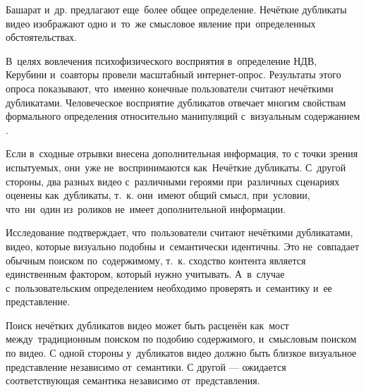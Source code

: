 \documentclass{.local/lib/classes/ndvr-super-article-standalone}
\begin{document}
    Башарат и~др. \cite{Basharat:2008}  
    предлагают еще~более общее определение.
    Нечёткие дубликаты видео изображают 
    одно и~то~же смысловое явление
    при~определенных обстоятельствах.

    В~целях вовлечения психофизического восприятия в~определение НДВ,
    Керубини и~соавторы \cite{Cherubini:2009} 
    провели масштабный интернет-опрос.
    Результаты этого опроса показывают, что~именно конечные пользователи
    считают нечёткими дубликатами.
    Человеческое восприятие дубликатов отвечает
    многим свойствам формального определения
    относительно манипуляций с~визуальным содержанием
    \cite{Wu:2007a, Shen:2007}.

    Если в~сходные отрывки внесена дополнительная информация,
    то с точки зрения испытуемых, 
    они~уже не~воспринимаются как~Нечёткие дубликаты.
    С~другой стороны, два разных видео с~различными героями
    при~различных сценариях оценены как~дубликаты, т.~к. они~имеют общий смысл,
    при~условии, что~ни~один из~роликов не~имеет дополнительной информации.

    Исследование подтверждает, что~пользователи считают 
    нечёткими дубликатами,
    видео, которые визуально подобны и~семантически идентичны.
    Это не~совпадает обычным поиском по~содержимому,
    т.~к. сходство контента является 
    единственным фактором, который нужно учитывать.
    А~в~случае с~пользовательским определением необходимо проверять
    и~семантику и~ее представление.

    Поиск нечётких дубликатов видео может быть расценён как~мост
    между~традиционным поиском по подобию содержимого,
    и~смысловым поиском по видео.
    С одной стороны у~дубликатов видео должно 
    быть близкое визуальное
    представление независимо от~семантики.
    С другой — ожидается соответствующая
    семантика независимо от~представления.





\end{document}
